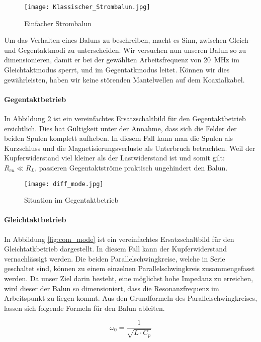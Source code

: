 \begin{figure}[H]
	\centering
	\texttt{[image: Klassischer\_Strombalun.jpg]}
	\caption{Einfacher Strombalun}\label{fig:klassischer_strombalun}
\end{figure}



\newpage

Um das Verhalten eines Baluns zu beschreiben, macht es Sinn, zwischen Gleich- und Gegentaktmodi zu unterscheiden. Wir versuchen nun unseren Balun so zu dimensionieren, damit er bei der gewählten Arbeitsfrequenz von \SI{20}{MHz} im Gleichtaktmodus sperrt, und im Gegentatkmodus leitet. Können wir dies gewährleisten, haben wir keine störenden Mantelwellen auf dem Koaxialkabel.

\paragraph{Gegentaktbetrieb}
In Abbildung \ref{fig:diff_mode} ist ein vereinfachtes Ersatzschaltbild für den Gegentaktbetrieb ersichtlich. Dies hat Gültigkeit unter der Annahme, dass sich die Felder der beiden Spulen komplett aufheben. In diesem Fall kann man die Spulen als Kurzschluss und die Magnetisierungsverluste als Unterbruch betrachten. 
Weil der Kupferwiderstand viel kleiner als der Lastwiderstand ist und somit gilt:  $R_{cu} \ll R_{L}$, passieren Gegentaktströme praktisch ungehindert den Balun.
\begin{figure}[H]
	\centering
	\texttt{[image: diff\_mode.jpg]}
	\caption{Situation im Gegentaktbetrieb}\label{fig:diff_mode}
\end{figure}

\paragraph{Gleichtaktbetrieb}
In Abbildung \ref{fig:com_mode} ist ein vereinfachtes Ersatzschaltbild für den Gleichtatkbetrieb dargestellt. In diesem Fall kann der Kupferwiderstand vernachlässigt werden. Die beiden Parallelschwingkreise, welche in Serie geschaltet sind, können zu einem einzelnen Parallelschwingkreis zusammengefasst werden. Da unser Ziel darin besteht, eine möglichst hohe Impedanz zu erreichen, wird dieser der Balun so dimensioniert, dass die Resonanzfrequenz im Arbeitspunkt zu liegen kommt. Aus den Grundformeln des Parallelschwingkreises, lassen sich folgende Formeln für den Balun ableiten.

\begin{equation}
\omega_{0} = \frac{1}{\sqrt{L \cdot C_{p}}}
\label{equ:Resonanzfrequenz}
\end{equation}

